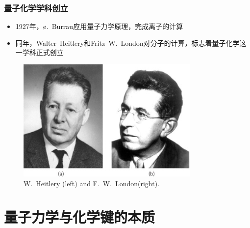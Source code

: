 \frame
{
	\frametitle{量子化学学科创立}
	\begin{itemize}
		\item \textrm{1927}年，\textrm{\o.~Burrau}应用量子力学原理，完成\textrm{}离子的计算
		\item 同年，\textrm{Walter~Heitlery}和\textrm{Fritz~W.~London}对\textrm{}分子的计算，标志着量子化学这一学科正式创立
	\end{itemize}
\begin{figure}[h!]
\centering
\vspace{-1.5pt}
\hspace*{-0.12in}
\includegraphics[height=0.48\textwidth,width=0.80\textwidth,viewport=0 10 260 175,clip]{Figures/Walter-Heitlery_Fritz-W-London.jpeg}
\caption{\textrm{W.~Heitlery (left) and F.~W.~London(right).}}
\label{Heitlery_London}
\end{figure}
}

\section{量子力学与化学键的本质}
